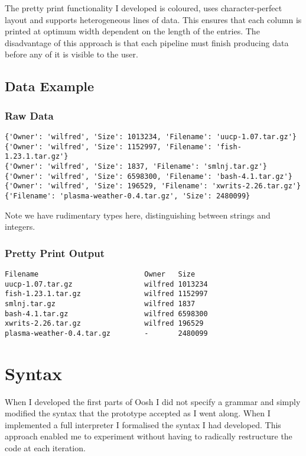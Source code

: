 \documentclass[12pt,twoside,notitlepage]{report}
\begin{document}
The pretty print functionality I developed is coloured, uses character-perfect
layout and supports heterogeneous lines of data. This ensures that each column
is printed at optimum width dependent on the length of the entries. The
disadvantage of this approach is that each pipeline must finish producing data
before any of it is visible to the user.

\subsection{Data Example}
\subsubsection{Raw Data}
\begin{verbatim}
{'Owner': 'wilfred', 'Size': 1013234, 'Filename': 'uucp-1.07.tar.gz'}
{'Owner': 'wilfred', 'Size': 1152997, 'Filename': 'fish-1.23.1.tar.gz'}
{'Owner': 'wilfred', 'Size': 1837, 'Filename': 'smlnj.tar.gz'}
{'Owner': 'wilfred', 'Size': 6598300, 'Filename': 'bash-4.1.tar.gz'}
{'Owner': 'wilfred', 'Size': 196529, 'Filename': 'xwrits-2.26.tar.gz'}
{'Filename': 'plasma-weather-0.4.tar.gz', 'Size': 2480099}
\end{verbatim}
Note we have rudimentary types here, distinguishing between strings and
integers.

\subsubsection{Pretty Print Output}
\begin{verbatim}
Filename                         Owner   Size      
uucp-1.07.tar.gz                 wilfred 1013234   
fish-1.23.1.tar.gz               wilfred 1152997   
smlnj.tar.gz                     wilfred 1837      
bash-4.1.tar.gz                  wilfred 6598300   
xwrits-2.26.tar.gz               wilfred 196529    
plasma-weather-0.4.tar.gz        -       2480099
\end{verbatim}

\section{Syntax}
When I developed the first parts of Oosh I did not specify a grammar and simply
modified the syntax that the prototype accepted as I went along. When I
implemented a full interpreter I formalised the syntax I had developed. This
approach enabled me to experiment without having to radically restructure the
code at each iteration.
\end{document}
